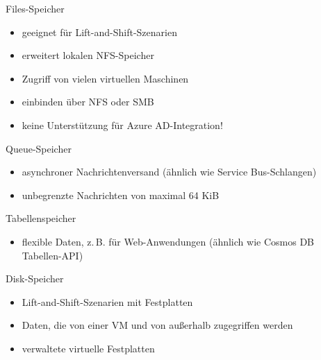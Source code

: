 \begin{flashcard}[Definition]{Files-Speicher}
  \begin{itemize}
    \item geeignet für Lift-and-Shift-Szenarien
    \item erweitert lokalen NFS-Speicher
    \item Zugriff von vielen virtuellen Maschinen
    \item einbinden über NFS oder SMB
    \item keine Unterstützung für Azure AD-Integration!
  \end{itemize}
\end{flashcard}

\begin{flashcard}[Definition]{Queue-Speicher}
  \begin{itemize}
    \item asynchroner Nachrichtenversand\newline
    (ähnlich wie Service Bus-Schlangen)
    \item unbegrenzte Nachrichten von maximal 64 KiB
  \end{itemize}
\end{flashcard}

\begin{flashcard}[Definition]{Tabellenspeicher}
  \begin{itemize}
    \item flexible Daten, z.\,B. für Web-Anwendungen\newline
    (ähnlich wie Cosmos DB Tabellen-API)
  \end{itemize}
\end{flashcard}

\begin{flashcard}[Definition]{Disk-Speicher}
  \begin{itemize}
    \item Lift-and-Shift-Szenarien mit Festplatten
    \item Daten, die von einer VM und von außerhalb zugegriffen werden
    \item verwaltete virtuelle Festplatten
  \end{itemize}
\end{flashcard}

